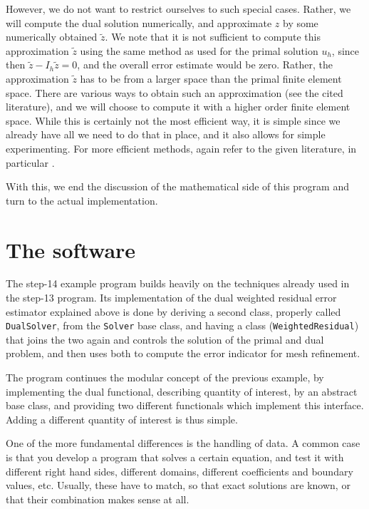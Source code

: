\documentclass{article}
\begin{document}
However, we do not want to restrict ourselves to such special cases. Rather,
we will compute the dual solution numerically, and approximate $z$ by some
numerically obtained $\tilde z$. We note that it is not sufficient to compute
this approximation $\tilde z$ using the same method as used for the primal
solution $u_h$, since then $\tilde z-I_h \tilde z=0$, and the overall error
estimate would be zero. Rather, the approximation $\tilde z$ has to be from a
larger space than the primal finite element space. There are various ways to
obtain such an approximation (see the cited literature), and we will choose to
compute it with a higher order finite element space. While this is certainly
not the most efficient way, it is simple since we already have all we need to
do that in place, and it also allows for simple experimenting. For more
efficient methods, again refer to the given literature, in particular
\cite{BR95,BR96r,BR01}.

With this, we end the discussion of the mathematical side of this program and
turn to the actual implementation.


\section{The software}

The step-14 example program builds heavily on the techniques already used in
the step-13 program. Its implementation of the dual weighted residual error
estimator explained above is done by deriving a second class, properly called
\texttt{DualSolver}, from the \texttt{Solver} base class, and having a class
(\texttt{WeightedResidual}) that joins the two again and controls the solution
of the primal and dual problem, and then uses both to compute the error
indicator for mesh refinement.

The program continues the modular concept of the previous example, by
implementing the dual functional, describing quantity of interest, by an
abstract base class, and providing two different functionals which implement
this interface. Adding a different quantity of interest is thus simple.

One of the more fundamental differences is the handling of data. A common case
is that you develop a program that solves a certain equation, and test it with
different right hand sides, different domains, different coefficients and
boundary values, etc. Usually, these have to match, so that exact solutions
are known, or that their combination makes sense at all.
\end{document}
